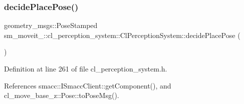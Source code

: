 \subsubsection{\texorpdfstring{decide\+Place\+Pose()}{decidePlacePose()}}
{\footnotesize\ttfamily geometry\+\_\+msgs\+::\+Pose\+Stamped sm\+\_\+moveit\+\_\+::cl\+\_\+perception\+\_\+system\+::\+Cl\+Perception\+System\+::decide\+Place\+Pose (\begin{DoxyParamCaption}{ }\end{DoxyParamCaption})\hspace{0.3cm}{\ttfamily [inline]}}



Definition at line 261 of file cl\+\_\+perception\+\_\+system.\+h.



References smacc\+::\+I\+Smacc\+Client\+::get\+Component(), and cl\+\_\+move\+\_\+base\+\_\+z\+::\+Pose\+::to\+Pose\+Msg().


